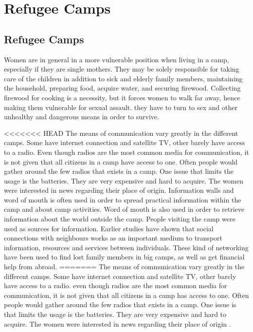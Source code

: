 \chapter{Refugee Camps}
\label{chp:refugeecamps} 

\section{Refugee Camps}

Women are in general in a more vulnerable position when living in a  camp, especially if they are single mothers. They may be solely responsible for taking care of the children in addition to sick and elderly family members, maintaining the household, preparing food, acquire water, and securing firewood. Collecting firewood for cooking is a necessity, but it forces women  to walk far away, hence making them vulnerable for sexual assault. they have to turn to sex and other unhealthy and dangerous means in order to survive. \cite{womenRefugee} 


<<<<<<< HEAD
The means of communication vary greatly in the different camps. Some have internet connection and satellite TV, other barely have access to a radio. Even though radios are the most common media for communication, it is not given that all citizens in a camp have access to one. Often people would gather around the few radios that exists in a camp. One issue that limits the usage is the batteries. They are very expensive and hard to acquire. The women were interested in news regarding their place of origin. 
Information walls and word of mouth is often used in order to spread practical information within the camp and about camp activities. Word of mouth is also used in order to retrieve information about the world outside the camp. People visiting the camp were used as sources for information. Earlier studies have shown that social connections with neighbours works as an important medium to transport information, resources and services between individuals. These kind of networking have been used to find lost family members in big camps, as well as get financial help from abroad.   
\cite{womenRefugee}  
=======
The means of communication vary greatly in the different camps. Some have internet connection and satellite TV, other barely have access to a radio. even though radios are the most common media for communication, it is not given that all citizens in a camp has access to one. Often people would gather around the few radios that exists in a camp. One issue is that limits the usage is the batteries. They are very expensive and hard to acquire. The women were interested in news regarding their place of origin \cite{womenRefugee}. 

